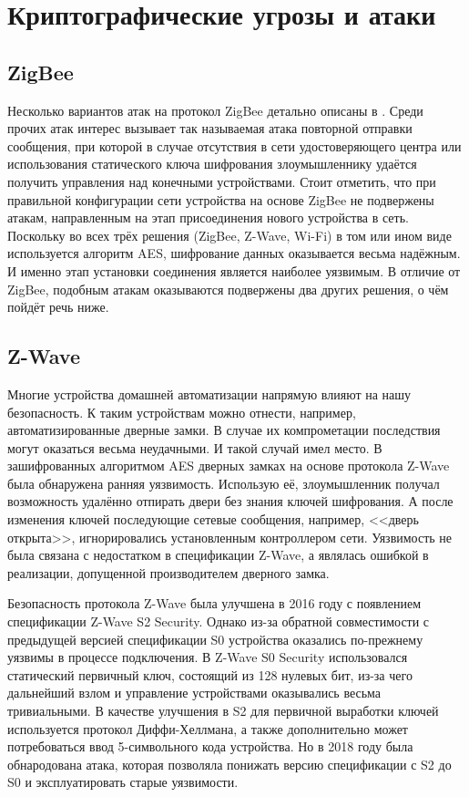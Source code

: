 \chapter{Криптографические угрозы и атаки}

	\section{ZigBee}
	Несколько вариантов атак на протокол ZigBee детально описаны в \cite{zigbee-attacks}. Среди прочих
	атак интерес вызывает так называемая атака повторной отправки сообщения, при которой в случае
	отсутствия в сети удостоверяющего центра или использования статического ключа шифрования
	злоумышленнику удаётся получить управления над конечными устройствами. Стоит отметить, что
	при правильной конфигурации сети устройства на основе ZigBee не подвержены атакам, направленным
	на этап присоединения нового устройства в сеть. Поскольку во всех трёх решения (ZigBee, Z-Wave, Wi-Fi)
	в том или ином виде используется алгоритм AES, шифрование данных оказывается весьма надёжным.
	И именно этап установки соединения является наиболее уязвимым. В отличие от ZigBee, подобным атакам
	оказываются подвержены два других решения, о чём пойдёт речь ниже.


	\section{Z-Wave}
	Многие устройства домашней автоматизации напрямую влияют на
	нашу безопасность. К таким устройствам можно отнести, например, автоматизированные дверные замки.
	В случае их компрометации последствия могут оказаться весьма неудачными. И такой случай
	имел место. В зашифрованных алгоритмом AES дверных замках на основе протокола Z-Wave была 
	обнаружена ранняя уязвимость. Использую её, злоумышленник получал возможность удалённо отпирать 
	двери без знания ключей шифрования. А после изменения ключей последующие сетевые сообщения, 
	например, <<дверь открыта>>, игнорировались установленным контроллером сети.
	Уязвимость не была связана с недостатком в спецификации Z-Wave, а являлась ошибкой 
	в реализации, допущенной производителем дверного замка.
	
	Безопасность протокола Z-Wave была улучшена в 2016 году с появлением спецификации Z-Wave S2 
	Security. Однако из-за обратной совместимости с предыдущей версией спецификации S0 устройства
	оказались по-прежнему уязвимы в процессе подключения. В Z-Wave S0 Security использовался статический
	первичный ключ, состоящий из 128 нулевых бит, из-за чего дальнейший взлом и управление устройствами 
	оказывались весьма тривиальными. В качестве улучшения в S2 для первичной выработки ключей 
	используется протокол Диффи-Хеллмана, а также дополнительно может потребоваться ввод 5-символьного
	кода устройства. Но в 2018 году была обнародована атака, которая позволяла понижать версию 
	спецификации с S2 до S0 и эксплуатировать старые уязвимости.
	
